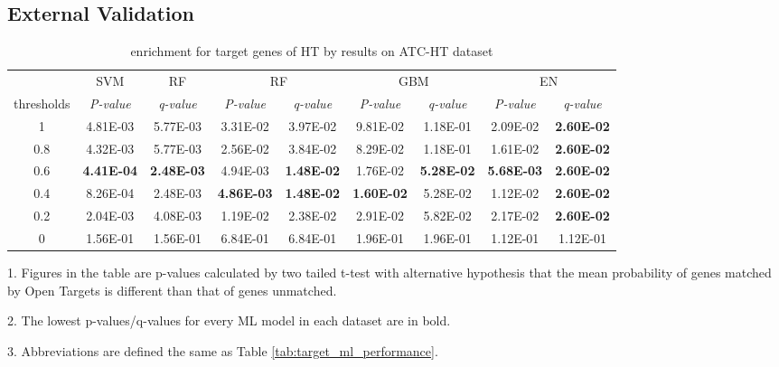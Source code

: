   \subsection{External Validation}  
    \begin{table}[htbp]
      \centering
      \caption{enrichment for target genes of HT by results on ATC-HT dataset}
      \begin{threeparttable}
        \tabcolsep=0.10cm
        \begin{tabular}{ccccccccc}
          \toprule
                & SVM   & RF    & \multicolumn{2}{c}{RF} & \multicolumn{2}{c}{GBM} & \multicolumn{2}{c}{EN} \\
          thresholds & \textit{P-value} & \textit{q-value} & \textit{P-value} & \textit{q-value} & \textit{P-value} & \textit{q-value} & \textit{P-value} & \textit{q-value} \\
          \midrule
          1     & 4.81E-03 & 5.77E-03 & 3.31E-02 & 3.97E-02 & 9.81E-02 & 1.18E-01 & 2.09E-02 & \textbf{2.60E-02} \\
          0.8   & 4.32E-03 & 5.77E-03 & 2.56E-02 & 3.84E-02 & 8.29E-02 & 1.18E-01 & 1.61E-02 & \textbf{2.60E-02} \\
          0.6   & \textbf{4.41E-04} & \textbf{2.48E-03} & 4.94E-03 & \textbf{1.48E-02} & 1.76E-02 & \textbf{5.28E-02} & \textbf{5.68E-03} & \textbf{2.60E-02} \\
          0.4   & 8.26E-04 & 2.48E-03 & \textbf{4.86E-03} & \textbf{1.48E-02} & \textbf{1.60E-02} & 5.28E-02 & 1.12E-02 & \textbf{2.60E-02} \\
          0.2   & 2.04E-03 & 4.08E-03 & 1.19E-02 & 2.38E-02 & 2.91E-02 & 5.82E-02 & 2.17E-02 & \textbf{2.60E-02} \\
          0     & 1.56E-01 & 1.56E-01 & 6.84E-01 & 6.84E-01 & 1.96E-01 & 1.96E-01 & 1.12E-01 & 1.12E-01 \\
          \bottomrule
          \end{tabular}%
          \begin{tablenotes}
            \item 1. Figures in the table are p-values calculated by two tailed t-test with alternative hypothesis that the mean probability of genes matched by Open Targets is different than that of genes unmatched. 
            \item 2. The lowest p-values/q-values for every ML model in each dataset are in bold.
            \item 3. Abbreviations are defined the same as Table \ref{tab:target_ml_performance}.  
          \end{tablenotes}
        \end{threeparttable}
        \label{tab:repurposing_enrichment_ht}%
      \end{table}%

